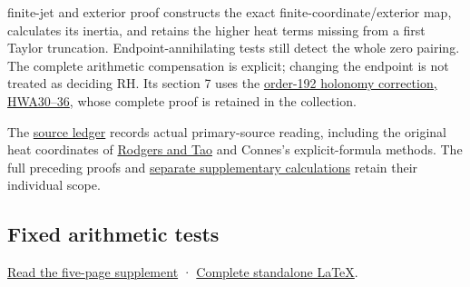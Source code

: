 \documentclass[
]{article}
\begin{document}
\begin{itemize}
{  finite-jet and exterior proof} constructs the exact
  finite-coordinate/exterior map, calculates its inertia, and retains
  the higher heat terms missing from a first Taylor truncation.
  Endpoint-annihilating tests still detect the whole zero pairing. The
  complete arithmetic compensation is explicit; changing the endpoint is
  not treated as deciding RH. Its section 7 uses the
  \href{https://github.com/KokunoYumeto/zeta-function-research-reader/blob/3c022a0adde0a6aa3d8fc8e43ef42795d88e44b0/workbenches/splitzero-tandem/branches/tau-zero-prime-positivity/HOLONOMY_AVERAGING_WEIL_ENDPOINT_DERIVATION.md}{order-192
  holonomy correction, HWA30--36}, whose complete proof is retained in
  the collection.
\end{itemize}

The
\href{https://github.com/KokunoYumeto/zeta-function-research-reader/blob/76f421965914beb133df797835f940849844dc4f/workbenches/splitzero-tandem/branches/tau-zero-prime-positivity/SOURCES.md}{source
ledger} records actual primary-source reading, including the original
heat coordinates of \href{https://arxiv.org/abs/1801.05914v5}{Rodgers
and Tao} and Connes's explicit-formula methods. The full preceding
proofs and
\href{https://github.com/KokunoYumeto/zeta-function-research-reader/blob/76f421965914beb133df797835f940849844dc4f/workbenches/splitzero-tandem/branches/tau-zero-prime-positivity/research_calculations/README.md}{separate
supplementary calculations} retain their individual scope.

\subsection{Fixed arithmetic tests}\label{fixed-arithmetic-tests}

\href{https://zenodo.org/records/22909184/files/165-splitzero-fixed-arithmetic-heat-flags.pdf?download=1}{Read
the five-page supplement} ·
\href{https://github.com/KokunoYumeto/zeta-function-research-reader/blob/76f421965914beb133df797835f940849844dc4f/workbenches/splitzero-tandem/continuations/20260923-fixed-arithmetic-heat-flags/FIXED_ARITHMETIC_HEAT_FLAGS.tex}{Complete
standalone LaTeX}.
\end{document}
